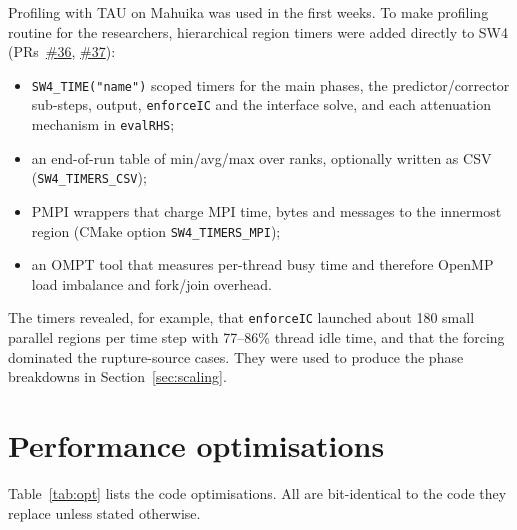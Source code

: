 \documentclass[11pt,a4paper]{article}
\newcommand{\pr}[1]{\href{https://github.com/ucgmsim/sw4/pull/#1}{\#{#1}}}
\newcommand{\code}[1]{\texttt{#1}}
\begin{document}
Profiling with TAU on Mahuika was used in the first weeks. To make profiling
routine for the researchers, hierarchical region timers were added directly to
SW4 (PRs~\pr{36}, \pr{37}):
\begin{itemize}[itemsep=0pt]
  \item \code{SW4\_TIME("name")} scoped timers for the main phases, the
        predictor/corrector sub-steps, output, \code{enforceIC} and the
        interface solve, and each attenuation mechanism in \code{evalRHS};
  \item an end-of-run table of min/avg/max over ranks, optionally written as
        CSV (\code{SW4\_TIMERS\_CSV});
  \item PMPI wrappers that charge MPI time, bytes and messages to the
        innermost region (CMake option \code{SW4\_TIMERS\_MPI});
  \item an OMPT tool that measures per-thread busy time and therefore OpenMP
        load imbalance and fork/join overhead.
\end{itemize}
The timers revealed, for example, that \code{enforceIC} launched about 180 small
parallel regions per time step with 77--86\% thread idle time, and that the
forcing dominated the rupture-source cases. They were used to produce the
phase breakdowns in Section~\ref{sec:scaling}.

\section{Performance optimisations}
\label{sec:opt}

Table~\ref{tab:opt} lists the code optimisations. All are bit-identical to the
code they replace unless stated otherwise.
\end{document}
